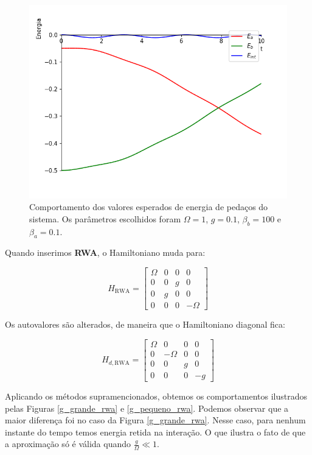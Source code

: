 \begin{figure}[!ht]
\includegraphics[scale=.4]{Content/g_pequeno.png}
\caption{Comportamento dos valores esperados de energia de pedaços do sistema. Os parâmetros escolhidos foram $\Omega = 1$, $g = 0.1$, $\beta_b=100$ e $\beta_a=0.1$.}
\label{g_pequeno}
\end{figure}

Quando inserimos \textbf{RWA}, o Hamiltoniano muda para:

\begin{equation}
H_{\text{RWA}} = \left[\begin{matrix}\Omega & 0 & 0 & 0\\0 & 0 & g & 0\\0 & g & 0 & 0\\0 & 0 & 0 & - \Omega\end{matrix}\right]
\end{equation}

Os autovalores são alterados, de maneira que o Hamiltoniano diagonal fica:

\begin{equation}
H_{d,\text{RWA}} = \left[\begin{matrix}\Omega & 0 & 0 & 0\\0 & - \Omega & 0 & 0\\0 & 0 & g & 0\\0 & 0 & 0 & - g\end{matrix}\right]
\end{equation}

Aplicando os métodos supramencionados, obtemos os comportamentos ilustrados pelas Figuras \ref{g_grande_rwa} e \ref{g_pequeno_rwa}. Podemos observar que a maior diferença foi no caso da Figura \ref{g_grande_rwa}. Nesse caso, para nenhum instante do tempo temos energia retida na interação. O que ilustra o fato de que a aproximação só é válida quando $\frac{g}{\Omega} \ll 1$.

